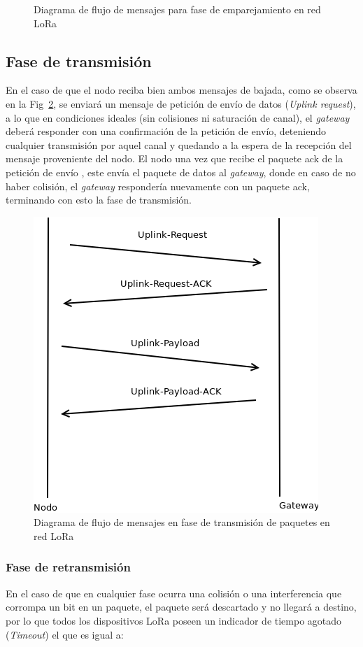 \begin{justify}
\begin{figure}[!ht]
\caption{Diagrama de flujo de mensajes para fase de emparejamiento en red LoRa}
\label{pair:1}
\end{figure}
\newpage
\noindent
\clearpage
\subsection{Fase de transmisión}

En el caso de que el nodo reciba bien ambos mensajes de bajada, como se observa en la Fig~\ref{trans:1}, se enviará un mensaje de petición de envío de datos (\textit{Uplink request}), a lo que en condiciones ideales (sin colisiones ni saturación de canal), el \textit{gateway} deberá responder con una confirmación de la petición de envío, deteniendo cualquier transmisión por aquel canal y quedando a la espera de la recepción del mensaje proveniente del nodo. El nodo una vez que recibe el paquete \gls{ack} de la petición de envío , este envía el paquete de datos al \textit{gateway}, donde en caso de no haber colisión, el \textit{gateway} respondería nuevamente con un paquete \gls{ack}, terminando con esto la fase de transmisión.\\


\begin{figure}[!ht]
\centering
\includegraphics[scale=0.6]{diagramas/transmit}
\caption{Diagrama de flujo de mensajes en fase de transmisión de paquetes en red LoRa}
\label{trans:1}
\end{figure}
\newpage
\subsubsection{Fase de retransmisión}
\justify
En el caso de que en cualquier fase ocurra una colisión o una interferencia que corrompa un bit en un paquete, el paquete será descartado y no llegará a destino, por lo que todos los dispositivos LoRa poseen un indicador de tiempo agotado (\textit{Timeout}) el que es igual a:
 

\end{justify}
